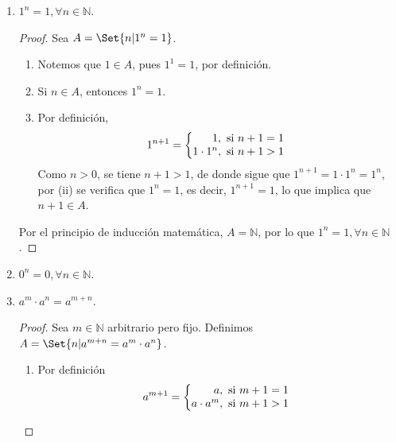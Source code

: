\documentclass[11pt]{article}
\newcommand{\N}{\mathbb{N}}
\let\set\Set
\begin{document}
\begin{enumerate}[label=\alph*)]
    \item $1^n=1, \forall n\in \N$.
    \vspace{-1em}
    \begin{proof} Sea $A=\set{n|1^n=1}$.
    \begin{enumerate}[label=\roman*)]
    \item Notemos que $1\in A$, pues $1^1=1$, por definición.
    \item Si $n\in A$, entonces $1^n=1$.
    \item Por definición, \begin{align*}
        1^{n+1} = \left\{
            \begin{array}{@{}r@{\thinspace}l}
                1, &  \ \text{si}  \ n+1 = 1\\
                1\cdot 1^{n}, &  \ \text{si}  \ n+1 > 1
            \end{array} \right.
        \end{align*}
    Como $n>0$, se tiene $n+1>1$, de donde sigue que $1^{n+1}=1\cdot 1^n=1^n$, por (ii) se verifica que $1^n=1$, es decir, $1^{n+1}=1$, lo que implica que $n+1\in A$.
    \end{enumerate}

    Por el principio de inducción matemática, $A=\N$, por lo que $1^n=1, \forall n\in \N$.
    \end{proof} \vspace{-1em}

    \item $0^n=0, \forall n\in \N$.
    

    \item $a^m \cdot a^n = a^{m+n}$.
    
    \vspace{-1em}
    \begin{proof} Sea $m\in \N$ arbitrario pero fijo. Definimos $A=\set{n|a^{m+n}=a^m\cdot a^n}$.

    \vspace{-1em}\begin{enumerate}[label=\roman*)]
    \item Por definición \vspace{1em}\begin{align*}
        a^{m+1} = \left\{
            \begin{array}{@{}r@{\thinspace}l}
                a, &  \ \text{si}  \ m+1 = 1\\
                a\cdot a^{m}, &  \ \text{si}  \ m+1 > 1
            \end{array} \right.
        \end{align*}\vspace{-1em}
        

\end{enumerate}
\end{proof}
\end{enumerate}
\end{document}
